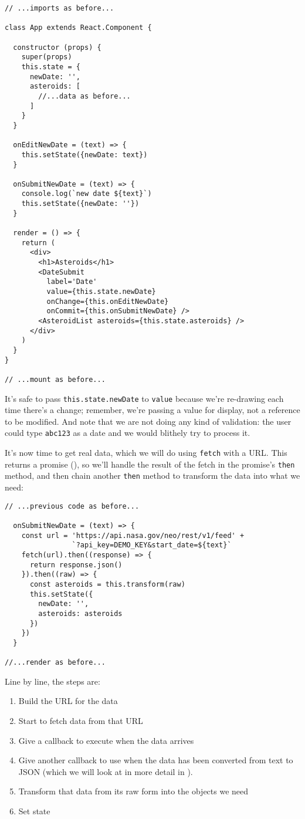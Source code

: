 \begin{verbatim}
// ...imports as before...

class App extends React.Component {

  constructor (props) {
    super(props)
    this.state = {
      newDate: '',
      asteroids: [
        //...data as before...
      ]
    }
  }

  onEditNewDate = (text) => {
    this.setState({newDate: text})
  }

  onSubmitNewDate = (text) => {
    console.log(`new date ${text}`)
    this.setState({newDate: ''})
  }

  render = () => {
    return (
      <div>
        <h1>Asteroids</h1>
        <DateSubmit
          label='Date'
          value={this.state.newDate}
          onChange={this.onEditNewDate}
          onCommit={this.onSubmitNewDate} />
        <AsteroidList asteroids={this.state.asteroids} />
      </div>
    )
  }
}

// ...mount as before...
\end{verbatim}

\noindent
It's safe to pass \texttt{this.state.newDate} to \texttt{value}
because we're re-drawing each time there's a change;
remember, we're passing a value for display,
not a reference to be modified.
And note that we are not doing any kind of validation:
the user could type \texttt{abc123} as a date
and we would blithely try to process it.

It's now time to get real data,
which we will do using \texttt{fetch} with a URL.
This returns a promise (),
so we'll handle the result of the fetch in the promise's \texttt{then} method,
and then chain another \texttt{then} method to transform the data into what we need:

\begin{verbatim}
// ...previous code as before...

  onSubmitNewDate = (text) => {
    const url = 'https://api.nasa.gov/neo/rest/v1/feed' +
                `?api_key=DEMO_KEY&start_date=${text}`
    fetch(url).then((response) => {
      return response.json()
    }).then((raw) => {
      const asteroids = this.transform(raw)
      this.setState({
        newDate: '',
        asteroids: asteroids
      })
    })
  }

//...render as before...
\end{verbatim}

Line by line,
the steps are:

\begin{enumerate}
\item
  Build the URL for the data
\item
  Start to fetch data from that URL
\item
  Give a callback to execute when the data arrives
\item
  Give another callback to use when the data has been converted from text to JSON
  (which we will look at in more detail in ).
\item
  Transform that data from its raw form into the objects we need
\item
  Set state
\end{enumerate}

